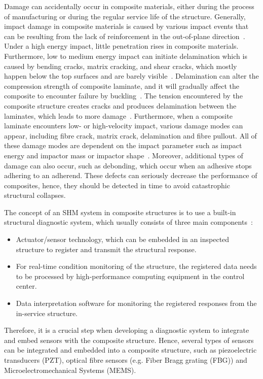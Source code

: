 Damage can accidentally occur in composite materials, either during the process of manufacturing or during the regular service life of the structure. 
Generally, impact damage in composite materials is caused by various impact events that can be resulting from the lack of reinforcement in the out-of-plane direction~\cite{Cai2012}. 
Under a high energy impact, little penetration rises in composite materials.  
Furthermore, low to medium energy impact can initiate delamination which is caused by bending cracks, matrix cracking, and shear cracks,  which mostly happen below the top surfaces and are barely visible~\cite{Cai2012}. 
Delamination can alter the compression strength of composite laminate, and it will gradually affect the composite to encounter failure by buckling~\cite{NurAzrieBtSafri2018}.
The tension encountered by the composite structure creates cracks and produces delamination between the laminates, which leads to more damage~\cite{NurAzrieBtSafri2018}. 
Furthermore, when a composite laminate encounters low- or high-velocity impact, various damage modes can appear, including fibre crack, matrix crack, delamination and fibre pullout. 
All of these damage modes are dependent on the impact parameter such as impact energy and impactor mass or impactor shape~\cite{NurAzrieBtSafri2018}.
Moreover, additional types of damage can also occur, such as debonding, which occur when an adhesive stops adhering to an adherend.
These defects can seriously decrease the performance of composites, hence, they should be detected in time to avoid catastrophic structural collapses.  

The concept of an SHM system in composite structures is to use a built-in structural diagnostic system, which usually consists of three main components~\cite{Hassani2022}: 
\begin{itemize}
	\item Actuator/sensor technology, which can be embedded in an inspected structure to register and transmit the structural response.
	\item For real-time condition monitoring of the structure, the registered data needs to be processed by high-performance computing equipment in the control center.
	\item Data interpretation software for monitoring the registered responses from the in-service structure.
\end{itemize}
Therefore, it is a crucial step when developing a diagnostic system to integrate and embed sensors with the composite structure. 
Hence, several types of sensors can be integrated and embedded into a composite structure, such as piezoelectric transducers (PZT), optical fibre sensors (e.g. Fiber Bragg grating (FBG)) and Microelectromechani\-cal Systems (MEMS).

